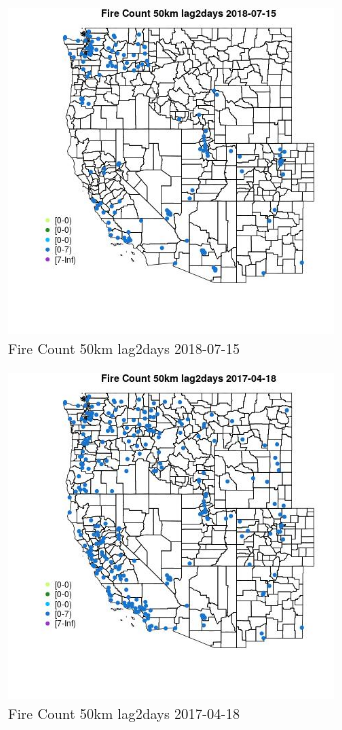 \begin{figure} 
\centering  
\includegraphics[width=0.77\textwidth]{Code_Outputs/Report_ML_input_PM25_Step4_part_e_de_duplicated_aves_compiled_2019-05-20wNAs_MapObsFire_Count_50km_lag2days2018-07-15.jpg} 
\caption{\label{fig:Report_ML_input_PM25_Step4_part_e_de_duplicated_aves_compiled_2019-05-20wNAsMapObsFire_Count_50km_lag2days2018-07-15}Fire Count 50km lag2days 2018-07-15} 
\end{figure} 
 

\begin{figure} 
\centering  
\includegraphics[width=0.77\textwidth]{Code_Outputs/Report_ML_input_PM25_Step4_part_e_de_duplicated_aves_compiled_2019-05-20wNAs_MapObsFire_Count_50km_lag2days2017-04-18.jpg} 
\caption{\label{fig:Report_ML_input_PM25_Step4_part_e_de_duplicated_aves_compiled_2019-05-20wNAsMapObsFire_Count_50km_lag2days2017-04-18}Fire Count 50km lag2days 2017-04-18} 
\end{figure} 
 

